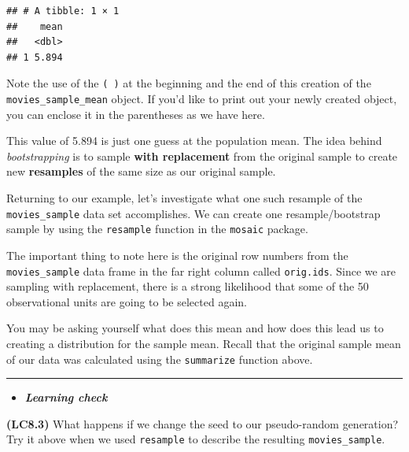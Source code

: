 \documentclass[]{tufte-book}
\newenvironment{Shaded}{\begin{snugshade}}{\end{snugshade}}
\newcommand{\KeywordTok}[1]{\textcolor[rgb]{0.13,0.29,0.53}{\textbf{{#1}}}}
\newcommand{\StringTok}[1]{\textcolor[rgb]{0.31,0.60,0.02}{{#1}}}
\newcommand{\NormalTok}[1]{{#1}}
\let\oldrule=\rule
\renewcommand{\rule}[1]{\oldrule{\linewidth}}
\newenvironment{rmdblock}[1]
  {\begin{shaded*}
  \begin{itemize}
  \renewcommand{\labelitemi}{
    \raisebox{-.7\height}[0pt][0pt]{
    }
  }
  \item
  }
  {
  \end{itemize}
  \end{shaded*}
  }
\newenvironment{learncheck}
  {\begin{rmdblock}{warning}}
  {\end{rmdblock}}
\begin{document}
\begin{verbatim}
## # A tibble: 1 × 1
##    mean
##   <dbl>
## 1 5.894
\end{verbatim}

Note the use of the \texttt{(\ )} at the beginning and the end of this
creation of the \texttt{movies\_sample\_mean} object. If you'd like to
print out your newly created object, you can enclose it in the
parentheses as we have here.

This value of 5.894 is just one guess at the population mean. The idea
behind \emph{bootstrapping} is to sample \textbf{with replacement} from
the original sample to create new \textbf{resamples} of the same size as
our original sample.

Returning to our example, let's investigate what one such resample of
the \texttt{movies\_sample} data set accomplishes. We can create one
resample/bootstrap sample by using the \texttt{resample} function in the
\texttt{mosaic} package.

\begin{Shaded}
\end{Shaded}

The important thing to note here is the original row numbers from the
\texttt{movies\_sample} data frame in the far right column called
\texttt{orig.ids}. Since we are sampling with replacement, there is a
strong likelihood that some of the 50 observational units are going to
be selected again.

You may be asking yourself what does this mean and how does this lead us
to creating a distribution for the sample mean. Recall that the original
sample mean of our data was calculated using the \texttt{summarize}
function above.

\begin{center}\rule{0.5\linewidth}{\linethickness}\end{center}

\begin{learncheck}
\textbf{\emph{Learning check}}
\end{learncheck}

\textbf{(LC8.3)} What happens if we change the seed to our pseudo-random
generation? Try it above when we used \texttt{resample} to describe the
resulting \texttt{movies\_sample}.
\end{document}
